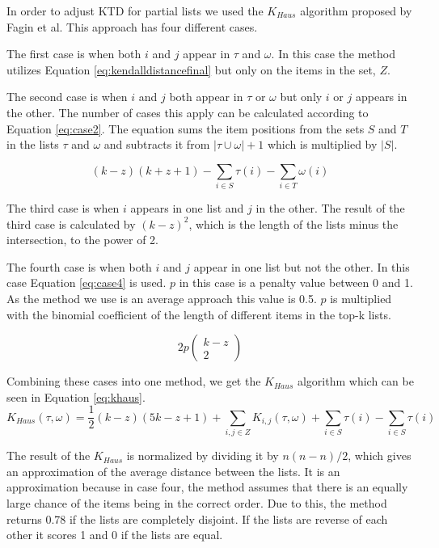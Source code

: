 In order to adjust KTD for partial lists we used the $K_{Haus}$ algorithm proposed by Fagin et al\cite{comparing:topk}. This approach has four different cases.

The first case is when both $i$ and $j$ appear in $\tau$ and $\omega$. In this case the method utilizes Equation \ref{eq:kendalldistancefinal} but only on the items in the set, $Z$.

The second case is when $i$ and $j$ both appear in $\tau$ or $\omega$ but only $i$ or $j$ appears in the other. The number of cases this apply can be calculated according to Equation \ref{eq:case2}. The equation sums the item positions from the sets $S$ and $T$ in the lists $\tau$ and $\omega$ and subtracts it from $|\tau \cup \omega| + 1$ which is multiplied by $|S|$.

\begin{equation}\label{eq:case2}
(k-z)(k+z+1)- \sum_{i \in S} \tau(i)- \sum_{i \in T} \omega(i)
\end{equation}

The third case is when $i$ appears in one list and $j$ in the other. The result of the third case is calculated by $(k-z)^2$, which is the length of the lists minus the intersection, to the power of 2.

The fourth case is when both $i$ and $j$ appear in one list but not the other. In this case Equation \ref{eq:case4} is used. $p$ in this case is a penalty value between 0 and 1. As the method we use is an average approach this value is 0.5. $p$ is multiplied with the binomial coefficient of the length of different items in the top-k lists.

\begin{equation}\label{eq:case4}
2p\left(\!
    \begin{array}{c}
      k-z \\
      2
    \end{array}
  \!\right)
\end{equation}


Combining these cases into one method, we get the $K_{Haus}$ algorithm which can be seen in Equation \ref{eq:khaus}. 
\footnotesize
\begin{equation}\label{eq:khaus}
K_{Haus}(\tau,\omega) = \frac{1}{2}(k-z)(5k-z+1)+ \sum_{i,j \in Z} K_{i,j}(\tau,\omega) + \sum_{i \in S}\tau(i) - \sum_{i \in S}\tau(i)
\end{equation}
\normalsize

The result of the $K_{Haus}$ is normalized by dividing it by $n(n-n)/2$, which gives an approximation of the average distance between the lists. It is an approximation because in case four, the method assumes that there is an equally large chance of the items being in the correct order. Due to this, the method returns 0.78 if the lists are completely disjoint. If the lists are reverse of each other it scores 1 and 0 if the lists are equal. %


